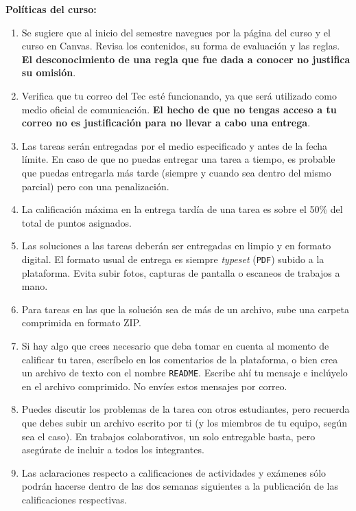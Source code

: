 \documentclass[12pt, letterpaper, oneside]{article}
\begin{document}
  \noindent\textbf{Políticas del curso:}  
  \begin{enumerate}
  \item Se sugiere que al inicio del semestre navegues por la página del curso y el curso en Canvas. Revisa los contenidos, su forma de evaluación y las reglas. \textbf{El desconocimiento de una regla que fue dada a conocer no justifica su omisión}.
  \item Verifica que tu correo del Tec esté funcionando, ya que será utilizado como medio oficial de comunicación. \textbf{El hecho de que no tengas acceso a tu correo no es justificación para no llevar a cabo una entrega}.
  \item Las tareas serán entregadas por el medio especificado y antes de la fecha límite. En caso de que no puedas entregar una tarea a tiempo, es probable que puedas entregarla más tarde (siempre y cuando sea dentro del mismo parcial) pero con una penalización.
  \item La calificación máxima en la entrega tardía de una tarea es sobre el 50\% del total de puntos asignados.
  \item Las soluciones a las tareas deberán ser entregadas en limpio y en formato digital. El formato usual de entrega es siempre \textit{typeset} (\texttt{PDF}) subido a la plataforma. Evita subir fotos, capturas de pantalla o escaneos de trabajos a mano.
  \item Para tareas en las que la solución sea de más de un archivo, sube una carpeta comprimida en formato ZIP.
  \item Si hay algo que crees necesario que deba tomar en cuenta al momento de calificar tu tarea, escríbelo en los comentarios de la plataforma, o bien crea un archivo de texto con el nombre \texttt{README}. Escribe ahí tu mensaje e inclúyelo en el archivo comprimido. No envíes estos mensajes por correo.
  \item Puedes discutir los problemas de la tarea con otros estudiantes, pero recuerda que debes subir un archivo escrito por ti (y los miembros de tu equipo, según sea el caso). En trabajos colaborativos, un solo entregable basta, pero asegúrate de incluir a todos los integrantes.
  \item Las aclaraciones respecto a calificaciones de actividades y exámenes sólo podrán hacerse dentro de las dos semanas siguientes a la publicación de las calificaciones respectivas.

\end{enumerate}
\end{document}
